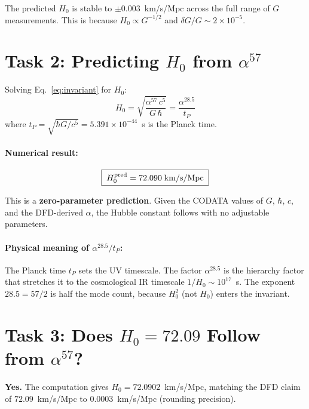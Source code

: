 \documentclass[11pt]{article}
\begin{document}
The predicted $H_0$ is stable to $\pm 0.003$~km/s/Mpc across the full range
of $G$ measurements. This is because $H_0 \propto G^{-1/2}$ and
$\delta G/G \sim 2 \times 10^{-5}$.

\section{Task 2: Predicting $H_0$ from $\alpha^{57}$}
\label{sec:H0-prediction}

Solving Eq.~\eqref{eq:invariant} for $H_0$:
\begin{equation}
H_0 = \sqrt{\frac{\alpha^{57}\,c^5}{G\,\hbar}}
= \frac{\alpha^{28.5}}{t_P}
\end{equation}
where $t_P = \sqrt{\hbar G/c^5} = 5.391 \times 10^{-44}$~s is the Planck time.

\paragraph{Numerical result:}
\begin{equation}
\boxed{\;H_0^{\rm pred} = 72.090 \;\text{km/s/Mpc}\;}
\end{equation}

This is a \textbf{zero-parameter prediction}. Given the CODATA values of
$G$, $\hbar$, $c$, and the DFD-derived $\alpha$, the Hubble constant follows
with no adjustable parameters.

\paragraph{Physical meaning of $\alpha^{28.5}/t_P$:}
The Planck time $t_P$ sets the UV timescale. The factor $\alpha^{28.5}$
is the hierarchy factor that stretches it to the cosmological IR timescale
$1/H_0 \sim 10^{17}$~s. The exponent $28.5 = 57/2$ is half the mode count,
because $H_0^2$ (not $H_0$) enters the invariant.

\section{Task 3: Does $H_0 = 72.09$ Follow from $\alpha^{57}$?}
\label{sec:H0-value}

\textbf{Yes.} The computation gives $H_0 = 72.0902$~km/s/Mpc, matching
the DFD claim of $72.09$~km/s/Mpc to $0.0003$~km/s/Mpc (rounding precision).
\end{document}
